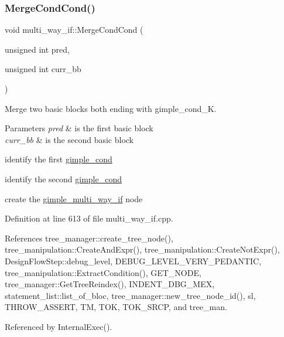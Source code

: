 \subsubsection{\texorpdfstring{Merge\+Cond\+Cond()}{MergeCondCond()}}
{\footnotesize\ttfamily void multi\+\_\+way\+\_\+if\+::\+Merge\+Cond\+Cond (\begin{DoxyParamCaption}\item[{unsigned int}]{pred,  }\item[{unsigned int}]{curr\+\_\+bb }\end{DoxyParamCaption})\hspace{0.3cm}{\ttfamily [private]}}



Merge two basic blocks both ending with gimple\+\_\+cond\+\_\+K. 


\begin{DoxyParams}{Parameters}
{\em pred} & is the first basic block \\
\hline
{\em curr\+\_\+bb} & is the second basic block \\
\hline
\end{DoxyParams}
identify the first \hyperlink{structgimple__cond}{gimple\+\_\+cond}

identify the second \hyperlink{structgimple__cond}{gimple\+\_\+cond}

create the \hyperlink{structgimple__multi__way__if}{gimple\+\_\+multi\+\_\+way\+\_\+if} node 

Definition at line 613 of file multi\+\_\+way\+\_\+if.\+cpp.



References tree\+\_\+manager\+::create\+\_\+tree\+\_\+node(), tree\+\_\+manipulation\+::\+Create\+And\+Expr(), tree\+\_\+manipulation\+::\+Create\+Not\+Expr(), Design\+Flow\+Step\+::debug\+\_\+level, D\+E\+B\+U\+G\+\_\+\+L\+E\+V\+E\+L\+\_\+\+V\+E\+R\+Y\+\_\+\+P\+E\+D\+A\+N\+T\+IC, tree\+\_\+manipulation\+::\+Extract\+Condition(), G\+E\+T\+\_\+\+N\+O\+DE, tree\+\_\+manager\+::\+Get\+Tree\+Reindex(), I\+N\+D\+E\+N\+T\+\_\+\+D\+B\+G\+\_\+\+M\+EX, statement\+\_\+list\+::list\+\_\+of\+\_\+bloc, tree\+\_\+manager\+::new\+\_\+tree\+\_\+node\+\_\+id(), sl, T\+H\+R\+O\+W\+\_\+\+A\+S\+S\+E\+RT, TM, T\+OK, T\+O\+K\+\_\+\+S\+R\+CP, and tree\+\_\+man.



Referenced by Internal\+Exec().

